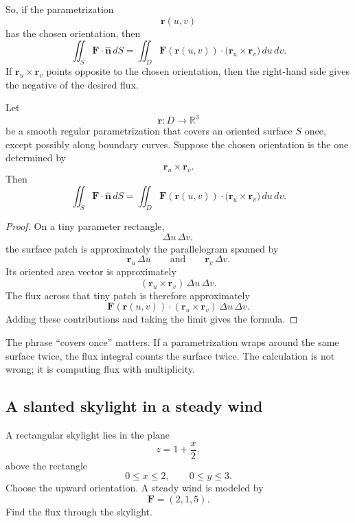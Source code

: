 So, if the parametrization
\[
    \mathbf r(u,v)
\]
has the chosen orientation, then
\[
\boxed{
    \iint_S \mathbf F\cdot\widehat{\mathbf n}\,dS
    =
    \iint_D
    \mathbf F(\mathbf r(u,v))\cdot
    \bigl(\mathbf r_u\times\mathbf r_v\bigr)\,du\,dv.
}
\]
If \(\mathbf r_u\times\mathbf r_v\) points opposite to the chosen orientation, then the
right-hand side gives the negative of the desired flux.

\begin{theorem}
Let
\[
    \mathbf r:D\to\mathbb R^3
\]
be a smooth regular parametrization that covers an oriented surface \(S\) once, except
possibly along boundary curves.  Suppose the chosen orientation is the one determined
by
\[
    \mathbf r_u\times\mathbf r_v.
\]
Then
\[
\boxed{
    \iint_S \mathbf F\cdot\widehat{\mathbf n}\,dS
    =
    \iint_D
    \mathbf F(\mathbf r(u,v))\cdot
    \bigl(\mathbf r_u\times\mathbf r_v\bigr)\,du\,dv.
}
\]
\end{theorem}

\begin{proof}
On a tiny parameter rectangle,
\[
    \Delta u\,\Delta v,
\]
the surface patch is approximately the parallelogram spanned by
\[
    \mathbf r_u\,\Delta u
    \qquad\text{and}\qquad
    \mathbf r_v\,\Delta v.
\]
Its oriented area vector is approximately
\[
    (\mathbf r_u\times\mathbf r_v)\,\Delta u\,\Delta v.
\]
The flux across that tiny patch is therefore approximately
\[
    \mathbf F(\mathbf r(u,v))\cdot
    (\mathbf r_u\times\mathbf r_v)\,\Delta u\,\Delta v.
\]
Adding these contributions and taking the limit gives the formula.
\end{proof}

The phrase ``covers once'' matters.  If a parametrization wraps around the same surface
twice, the flux integral counts the surface twice.  The calculation is not wrong; it is
computing flux with multiplicity.

\subsection{A slanted skylight in a steady wind}

A rectangular skylight lies in the plane
\[
    z=1+\frac{x}{2},
\]
above the rectangle
\[
    0\le x\le2,\qquad 0\le y\le3.
\]
Choose the upward orientation.  A steady wind is modeled by
\[
    \mathbf F=(2,1,5).
\]
Find the flux through the skylight.

